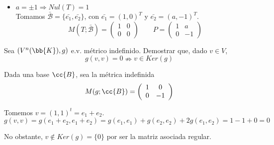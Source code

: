 \begin{ejercicio}
\begin{itemize}
\begin{itemize}
            

            \item $a=\pm 1 \Longrightarrow Nul(T)=1$ \\

            Tomamos $\bar{\mathcal{B}} = \{\bar{e_1}, \bar{e_2}\}$, con $\bar{e_1} = (1,0)^T$ y $\bar{e_2} = (a, -1)^T$.
            \begin{equation*}
                M(T;\bar{\mathcal{B}}) = \left( \begin{array}{cc}
                    1 & 0 \\
                    0 & 0
                \end{array} \right) \qquad
                P = \left( \begin{array}{cc}
                    1 & a \\
                    0 & -1
                \end{array} \right)
            \end{equation*}
        \end{itemize} 
    \end{itemize}
\end{ejercicio}

\begin{ejercicio}
    Sea $(V^n(\bb{K}),g)$ e.v. métrico indefinido. Demostrar que, dado $v\in V$,
    $$g(v,v)=0\nRightarrow v\in Ker(g)$$

    Dada una base $\cc{B}$, sea la métrica indefinida
    \begin{equation*}
        M(g;\cc{B}) = \left(\begin{array}{cc}
            1 & 0 \\
            0 & -1 \\
        \end{array} \right)
    \end{equation*}

    Tomemos $v=(1,1)^t = e_1 + e_2$.
    \begin{equation*}
        g(v,v) = g(e_1+e_2,e_1+e_2) = g(e_1,e_1) + g(e_2,e_2)+2g(e_1,e_2)=1-1+0 = 0
    \end{equation*}

    No obstante, $v\notin Ker(g)=\{0\}$ por ser la matriz asociada regular.
\end{ejercicio}

